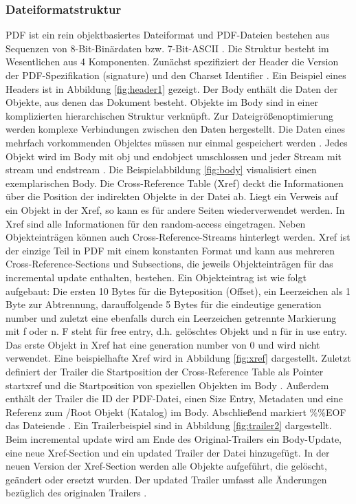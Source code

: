 \subsubsection{Dateiformatstruktur}
PDF ist ein rein objektbasiertes Dateiformat und PDF-Dateien bestehen aus Sequenzen von 8-Bit-Binärdaten bzw. 7-Bit-ASCII \cite{schneeberger}. Die Struktur besteht im Wesentlichen aus 4 Komponenten. Zunächst spezifiziert der Header die Version der PDF-Spezifikation (signature) und den Charset Identifier \cite{ccc-pdf-secrets}. Ein Beispiel eines Headers ist in Abbildung \ref{fig:header1} gezeigt. Der Body enthält die Daten der Objekte, aus denen das Dokument besteht. Objekte im Body sind in einer komplizierten hierarchischen Struktur verknüpft. Zur Dateigrößenoptimierung werden komplexe Verbindungen zwischen den Daten hergestellt. Die Daten eines mehrfach vorkommenden Objektes müssen nur einmal gespeichert werden \cite{softx}. Jedes Objekt wird im Body mit obj und endobject umschlossen und jeder Stream mit stream und endstream \cite{schneeberger}. Die Beispielabbildung \ref{fig:body} visualisiert einen exemplarischen Body. Die Cross-Reference Table (Xref) deckt die Informationen über die Position der indirekten Objekte in der Datei ab. Liegt ein Verweis auf ein Objekt in der Xref, so kann es für andere Seiten wiederverwendet werden. In Xref sind alle Informationen für den random-access eingetragen. Neben Objekteinträgen können auch Cross-Reference-Streams hinterlegt werden. Xref ist der einzige Teil in PDF mit einem konstanten Format und kann aus mehreren Cross-Reference-Sections und Subsections, die jeweils Objekteinträgen für das incremental update enthalten, bestehen. Ein Objekteintrag ist wie folgt aufgebaut: Die ersten 10 Bytes für die Byteposition (Offset), ein Leerzeichen als 1 Byte zur Abtrennung, darauffolgende 5 Bytes für die eindeutige generation number und zuletzt eine ebenfalls durch ein Leerzeichen getrennte Markierung mit f oder n. F steht für free entry, d.h. gelöschtes Objekt und n für in use entry. Das erste Objekt in Xref hat eine generation number von 0 und wird nicht verwendet. Eine beispielhafte Xref wird in Abbildung \ref{fig:xref} dargestellt. Zuletzt definiert der Trailer die Startposition der Cross-Reference Table als Pointer startxref und die Startposition von speziellen Objekten im Body \cite{ccc-break-pdf}.  Außerdem enthält der Trailer die ID der PDF-Datei, einen Size Entry, Metadaten und eine Referenz zum /Root Objekt (Katalog) im Body. Abschließend markiert \%\%EOF das Dateiende \cite{ccc-break-pdf, ccc-pdf-secrets}. Ein Trailerbeispiel sind in Abbildung \ref{fig:trailer2} dargestellt. Beim incremental update wird am Ende des Original-Trailers ein Body-Update, eine neue Xref-Section und ein updated Trailer der Datei hinzugefügt. In der neuen Version der Xref-Section werden alle Objekte aufgeführt, die gelöscht, geändert oder ersetzt wurden. Der updated Trailer umfasst alle Änderungen bezüglich des originalen Trailers \cite{schneeberger}. 

